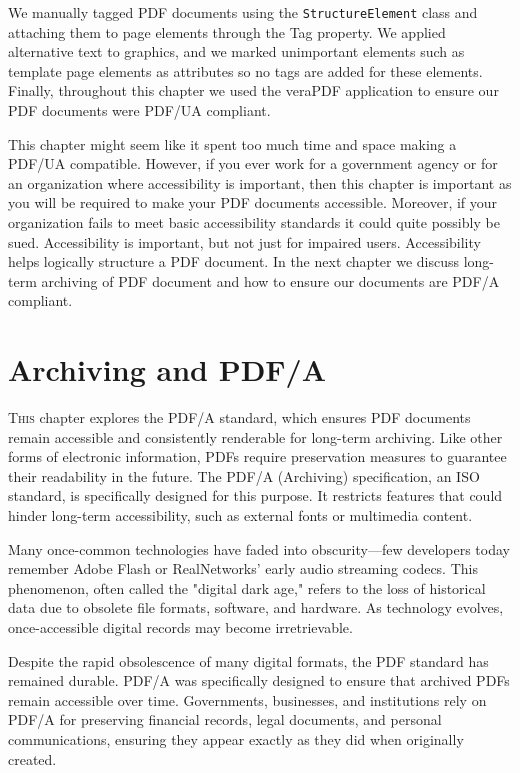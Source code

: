 \documentclass[american,letterpaper]{tufte-book}
\numberwithin{equation}{section}
\numberwithin{figure}{section}
\def\color#1{}%
\begin{document}
{{We manually tagged PDF documents using the \texttt{StructureElement} class
and attaching them to page elements through the Tag property. We applied
alternative text to graphics, and we marked unimportant elements such
as template page elements as attributes so no tags are added for these
elements. Finally, throughout this chapter we used the veraPDF application
to ensure our PDF documents were PDF/UA compliant.

This chapter might seem like it spent too much time and space making
a PDF/UA compatible. However, if you ever work for a government agency
or for an organization where accessibility is important, then this
chapter is important as you will be required to make your PDF documents
accessible. Moreover, if your organization fails to meet basic accessibility
standards it could quite possibly be sued. Accessibility is important,
but not just for impaired users. Accessibility helps logically structure
a PDF document. In the next chapter we discuss long-term archiving
of PDF document and how to ensure our documents are PDF/A compliant.

\color{white}
\chapter{Archiving and PDF/A}\label{chap:Archiving-and-PDF/A}
\color{black}
\BgThispage
\vspace{8.0em}
\lettrine[lines=2,lhang=0.1]{T}{his} chapter explores the PDF/A standard, which ensures PDF documents remain accessible and consistently renderable for long-term archiving. Like other forms of electronic information, PDFs require preservation measures to guarantee their readability in the future. The PDF/A (Archiving) specification, an ISO standard, is specifically designed for this purpose. It restricts features that could hinder long-term accessibility, such as external fonts or multimedia content.

Many once-common technologies have faded into obscurity—few developers today remember Adobe Flash or RealNetworks’ early audio streaming codecs. This phenomenon, often called the "digital dark age," refers to the loss of historical data due to obsolete file formats, software, and hardware. As technology evolves, once-accessible digital records may become irretrievable.

Despite the rapid obsolescence of many digital formats, the PDF standard has remained durable. PDF/A was specifically designed to ensure that archived PDFs remain accessible over time. Governments, businesses, and institutions rely on PDF/A for preserving financial records, legal documents, and personal communications, ensuring they appear exactly as they did when originally created.

}}
\end{document}
